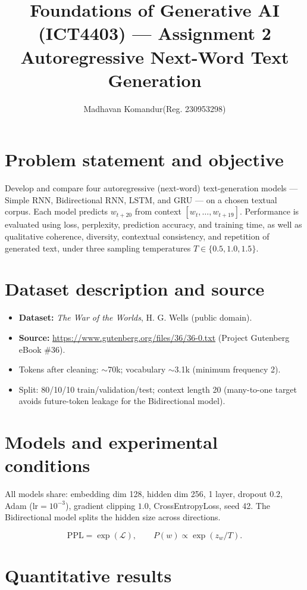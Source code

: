\documentclass[11pt]{article}
\title{Foundations of Generative AI (ICT4403) --- Assignment 2\\
Autoregressive Next-Word Text Generation}
\author{Madhavan Komandur\quad (Reg. 230953298)}
\date{}
\begin{document}
\maketitle

\section{Problem statement and objective}
Develop and compare four autoregressive (next-word) text-generation models ---
Simple RNN, Bidirectional RNN, LSTM, and GRU --- on a chosen textual corpus. Each model
predicts $w_{t+20}$ from context $[w_t,\dots,w_{t+19}]$. Performance is evaluated using
loss, perplexity, prediction accuracy, and training time, as well as qualitative coherence,
diversity, contextual consistency, and repetition of generated text, under three sampling
temperatures $T\in\{0.5,1.0,1.5\}$.

\section{Dataset description and source}
\begin{itemize}
\item \textbf{Dataset:} \textit{The War of the Worlds}, H. G. Wells (public domain).
\item \textbf{Source:} \url{https://www.gutenberg.org/files/36/36-0.txt} (Project Gutenberg eBook \#36).
\item Tokens after cleaning: $\sim$70k; vocabulary $\sim$3.1k (minimum frequency 2).
\item Split: 80/10/10 train/validation/test; context length 20 (many-to-one target avoids
  future-token leakage for the Bidirectional model).
\end{itemize}

\section{Models and experimental conditions}
All models share: embedding dim 128, hidden dim 256, 1 layer, dropout 0.2, Adam
($\mathrm{lr}=10^{-3}$), gradient clipping $1.0$, CrossEntropyLoss, seed 42.
The Bidirectional model splits the hidden size across directions.

\[
\mathrm{PPL} = \exp(\mathcal L), \qquad
P(w)\propto \exp(z_w/T).
\]

\section{Quantitative results}
\end{document}
